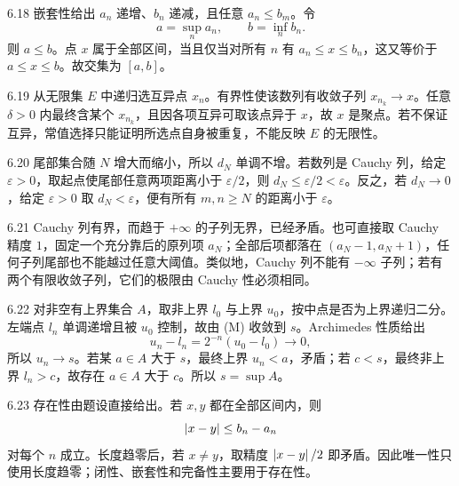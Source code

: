 \begin{solution}{6.18}
嵌套性给出 \(a_n\) 递增、\(b_n\) 递减，且任意 \(a_n\le b_m\)。令
\[
 a=\sup_n a_n,\qquad b=\inf_n b_n.
\]
则 \(a\le b\)。点 \(x\) 属于全部区间，当且仅当对所有 \(n\) 有 \(a_n\le x\le b_n\)，这又等价于 \(a\le x\le b\)。故交集为 \([a,b]\)。
\end{solution}

\begin{solution}{6.19}
从无限集 \(E\) 中递归选互异点 \(x_n\)。有界性使该数列有收敛子列 \(x_{n_k}\to x\)。任意 \(\delta>0\) 内最终含某个 \(x_{n_k}\)，且因各项互异可取该点异于 \(x\)，故 \(x\) 是聚点。若不保证互异，常值选择只能证明所选点自身被重复，不能反映 \(E\) 的无限性。
\end{solution}

\begin{solution}{6.20}
尾部集合随 \(N\) 增大而缩小，所以 \(d_N\) 单调不增。若数列是 Cauchy 列，给定 \(\varepsilon>0\)，取起点使尾部任意两项距离小于 \(\varepsilon/2\)，则 \(d_N\le\varepsilon/2<\varepsilon\)。反之，若 \(d_N\to0\)，给定 \(\varepsilon>0\) 取 \(d_N<\varepsilon\)，便有所有 \(m,n\ge N\) 的距离小于 \(\varepsilon\)。
\end{solution}

\begin{solution}{6.21}
Cauchy 列有界，而趋于 \(+\infty\) 的子列无界，已经矛盾。也可直接取 Cauchy 精度 \(1\)，固定一个充分靠后的原列项 \(a_N\)；全部后项都落在 \((a_N-1,a_N+1)\)，任何子列尾部也不能越过任意大阈值。类似地，Cauchy 列不能有 \(-\infty\) 子列；若有两个有限收敛子列，它们的极限由 Cauchy 性必须相同。
\end{solution}

\begin{solution}{6.22}
对非空有上界集合 \(A\)，取非上界 \(l_0\) 与上界 \(u_0\)，按中点是否为上界递归二分。左端点 \(l_n\) 单调递增且被 \(u_0\) 控制，故由 (M) 收敛到 \(s\)。Archimedes 性质给出
\[
 u_n-l_n=2^{-n}(u_0-l_0)\to0,
\]
所以 \(u_n\to s\)。若某 \(a\in A\) 大于 \(s\)，最终上界 \(u_n<a\)，矛盾；若 \(c<s\)，最终非上界 \(l_n>c\)，故存在 \(a\in A\) 大于 \(c\)。所以 \(s=\sup A\)。
\end{solution}

\begin{solution}{6.23}
存在性由题设直接给出。若 \(x,y\) 都在全部区间内，则
\[
 \left|x-y\right|\le b_n-a_n
\]
对每个 \(n\) 成立。长度趋零后，若 \(x\ne y\)，取精度 \(\left|x-y\right|/2\) 即矛盾。因此唯一性只使用长度趋零；闭性、嵌套性和完备性主要用于存在性。
\end{solution}

